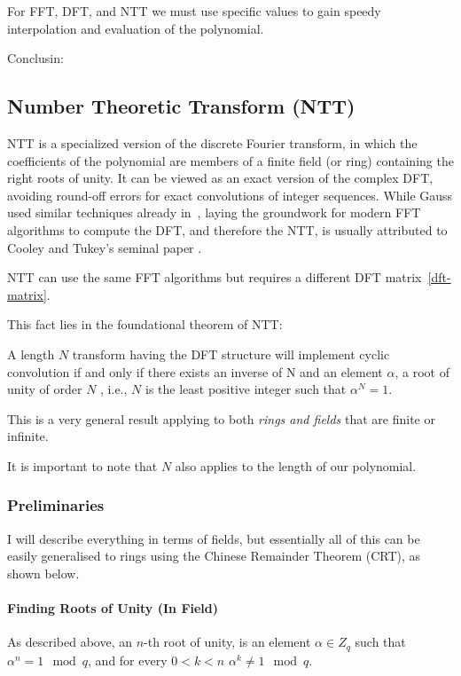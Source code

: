  \begin{corollary}
  For FFT, DFT, and NTT we must use specific values to gain speedy interpolation and
  evaluation of the polynomial. 
 \end{corollary}{Conclusin:}
 
\subsection{Number Theoretic Transform (NTT)}

NTT is a specialized version of the discrete Fourier transform,
in which the coefficients of the polynomial are members of a finite field (or ring)
 containing the right roots of unity.
It can be viewed as an exact version of the complex DFT, avoiding 
round-off errors for exact convolutions of integer sequences.
While Gauss used similar techniques already in~\cite{gaussfft}, laying the groundwork 
for modern FFT algorithms to compute the DFT, and therefore the NTT, 
is usually attributed to Cooley and Tukey's seminal paper \cite{fft}.

NTT can use the same FFT algorithms but requires a 
different DFT matrix~\ref{dft-matrix}.

This fact lies in the foundational theorem of NTT:
\begin{thm}
  A length $N$ transform having the DFT structure will
  implement cyclic convolution if and only if there exists an 
  inverse of N and an element $\alpha$,
  a root of unity of order $N$ , i.e., $N$ is the least 
  positive integer such that $\alpha^N =1$.
\end{thm}
This is a very general result applying to both \emph{rings and fields} that are
finite or infinite.

It is important to note that $N$ also applies to the length of our polynomial.

\subsubsection{Preliminaries}
I will describe everything in terms of fields, but essentially all of this can be easily generalised to rings 
using the Chinese Remainder Theorem (CRT), as shown below.
\paragraph{\bf Finding Roots of Unity (In Field)}
As described above, an $n$-th root of unity, is an element $\alpha\in Z_q$ 
such that $\alpha^n =1  \mod q $, and for every $0<k<n$ $\alpha^k \neq 1 \mod q$.

